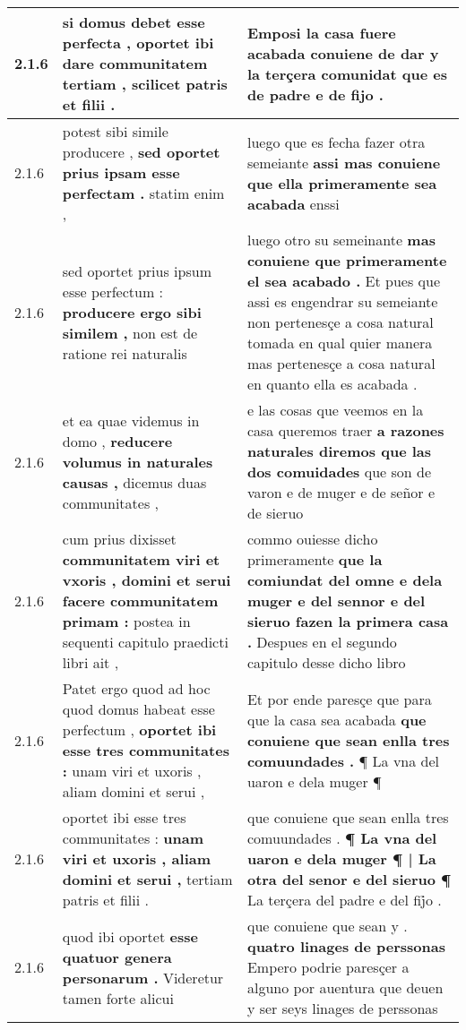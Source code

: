 \begin{tabular}{|p{1cm}|p{6.5cm}|p{6.5cm}|}
2.1.6 & si domus debet esse perfecta , \textbf{ oportet ibi dare communitatem tertiam , } scilicet patris et filii . & Emposi la casa fuere acabada conuiene de dar \textbf{ y la terçera comunidat } que es de padre e de fijo . \\\hline
2.1.6 & potest sibi simile producere , \textbf{ sed oportet prius ipsam esse perfectam . } statim enim , & luego que es fecha fazer otra semeiante \textbf{ assi mas conuiene que ella primeramente sea acabada } enssi \\\hline
2.1.6 & sed oportet prius ipsum esse perfectum : \textbf{ producere ergo sibi similem , } non est de ratione rei naturalis & luego otro su semeinante \textbf{ mas conuiene que primeramente el sea acabado . } Et pues que assi es engendrar su semeiante non pertenesçe a cosa natural tomada en qual quier manera mas pertenesçe a cosa natural en quanto ella es acabada . \\\hline
2.1.6 & et ea quae videmus in domo , \textbf{ reducere volumus in naturales causas , } dicemus duas communitates , & e las cosas que veemos en la casa queremos traer \textbf{ a razones naturales diremos que las dos comuidades } que son de varon e de muger e de señor e de sieruo \\\hline
2.1.6 & cum prius dixisset \textbf{ communitatem viri et vxoris , domini et serui facere communitatem primam : } postea in sequenti capitulo praedicti libri ait , & commo ouiesse dicho primeramente \textbf{ que la comiundat del omne e dela muger e del sennor e del sieruo fazen la primera casa . } Despues en el segundo capitulo desse dicho libro \\\hline
2.1.6 & Patet ergo quod ad hoc quod domus habeat esse perfectum , \textbf{ oportet ibi esse tres communitates : } unam viri et uxoris , aliam domini et serui , & Et por ende paresçe que para que la casa sea acabada \textbf{ que conuiene que sean enlla tres comuundades . } ¶ La vna del uaron e dela muger ¶ \\\hline
2.1.6 & oportet ibi esse tres communitates : \textbf{ unam viri et uxoris , aliam domini et serui , } tertiam patris et filii . & que conuiene que sean enlla tres comuundades . \textbf{ ¶ La vna del uaron e dela muger ¶ | La otra del senor e del sieruo ¶ } La terçera del padre e del fij̉o . \\\hline
2.1.6 & quod ibi oportet \textbf{ esse quatuor genera personarum . } Videretur tamen forte alicui & que conuiene que sean y . \textbf{ quatro linages de perssonas } Empero podrie paresçer a alguno por auentura que deuen y ser seys linages de perssonas \\\hline

\end{tabular}
